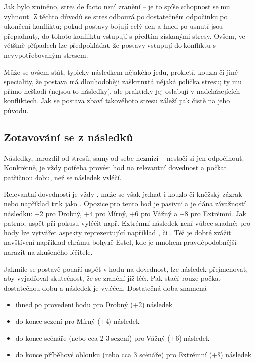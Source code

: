 \documentclass[../main.tex]{subfiles}
\begin{document}
Jak bylo zmíněno, stres de facto není zranění – je to spíše schopnost se mu vyhnout. Z
těchto důvodů se stres odbourá po dostatečném odpočinku po ukončení konfliktu; pokud
postavy bojují celý den a hned po usnutí jsou přepadnuty, do tohoto konfliktu vstupují s
předtím získanými stresy. Ovšem, ve většině případech lze předpokládat, že postavy
vstupují do konfliktu s nevypotřebovaným stresem. 

Může se ovšem stát, typicky následkem nějakého jedu, prokletí, kouzla či jiné speciality,
že postava má dlouhodoběji zaškrtnutá nějaká políčka stresu; ty mu přímo neškodí (nejsou
to následky), ale prakticky jej oslabují v nadcházejících konfliktech. Jak se postava
zbaví takovéhoto stresu záleží pak čistě na jeho původu.

\subsection{Zotavování se z následků}
\label{sec:zot-nasledky}

Následky, narozdíl od stresů, samy od sebe nezmizí – nestačí si jen odpočinout.
Konkrétně, je vždy potřeba provést hod na relevantní dovednost a počkat patřičnou dobu,
než se následek vyléčí.

Relevantní dovedností je vždy , může se však jednat i kouzlo či kněžský
zázrak nebo například trik jako . Opozice pro tento hod je pasivní a je
dána závažností následku: +2 pro Drobný, +4 pro Mírný, +6 pro Vážný a +8 pro Extrémní.
Jak patrno, uspět při pokusu vyléčit např. Extrémní následek není vůbec snadné; pro hody
lze vytvářet aspekty reprezentující například ,  či . Též je dobré zvážit navštívení například
chrámu bohyně Estel, kde je mnohem pravděpodobnější narazit na zkušeného léčitele.

Jakmile se postavě podaří uspět v hodu na dovednost, lze následek přejmenovat, aby
vyjadřoval skutečnost, že se zranění již léčí. Pak stačí pouze počkat dostatečnou dobu a
následek je vyléčen. Dostatečná doba znamená

\begin{itemize}
  \item ihned po provedení hodu pro Drobný (+2) následek
  \item do konce sezení pro Mírný (+4) následek
  \item do konce scénáře (nebo cca 2-3 sezení) pro Vážný (+6) následek
  \item do konce příběhové oblouku (nebo cca 3 scénáře) pro Extrémní (+8) následek
\end{itemize}
\end{document}
